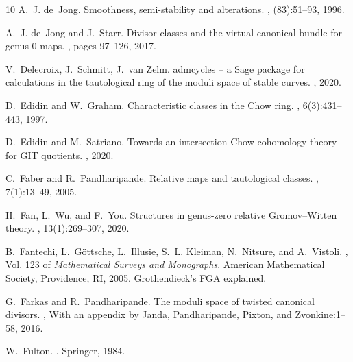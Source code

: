 \documentclass[a4paper,12pt]{article} %
\theoremstyle{definition}
\theoremstyle{plain}%
\begin{document}
\begin{thebibliography}{10}
A.~J. de~Jong.
\newblock Smoothness, semi-stability and alterations.
, (83):51--93, 1996.

A.~J. de~Jong and J.~Starr.
\newblock Divisor classes and the virtual canonical bundle for genus $0$ maps.
, pages 97--126, 2017.

V.~Delecroix, J.~Schmitt, J.~van Zelm.
\newblock admcycles -- a Sage package for calculations in the tautological ring of the moduli space of stable curves.
, 2020.

D.~Edidin and W.~Graham.
\newblock Characteristic classes in the {C}how ring.
, 6(3):431--443, 1997.

D.~Edidin and M.~Satriano.
\newblock Towards an intersection {C}how cohomology theory for {GIT} quotients.
, 2020.

C.~Faber and R.~Pandharipande.
\newblock Relative maps and tautological classes.
,
  7(1):13--49, 2005.

H.~Fan, L.~Wu, and F.~You.
\newblock Structures in genus-zero relative {Gromov--Witten} theory.
, 13(1):269--307, 2020.

B.~Fantechi, L.~G{\"o}ttsche, L.~Illusie, S.~L. Kleiman, N.~Nitsure, and
  A.~Vistoli.
, Vol. 123 of {\em Mathematical
  Surveys and Monographs}.
\newblock American Mathematical Society, Providence, RI, 2005.
\newblock Grothendieck's FGA explained.

G.~Farkas and R.~Pandharipande.
\newblock The moduli space of twisted canonical divisors.
, With an
  appendix by Janda, Pandharipande, Pixton, and Zvonkine:1--58, 2016.


W.~Fulton.
.
\newblock Springer, 1984.


\end{thebibliography}
\end{document}
